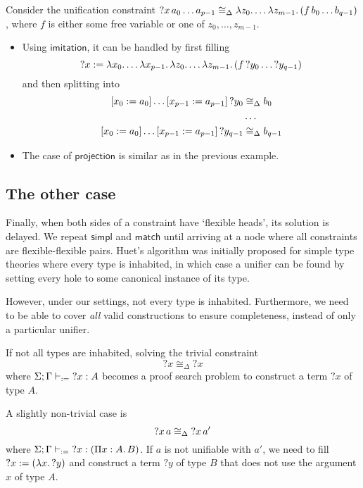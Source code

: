 \documentclass[twoside]{report}
\begin{document}
\begin{example}
Consider the unification constraint ${{{?x}\,{a_0}}\,{\ldots}}\,{a_{p-1}} \cong_\Delta \lambda{z_0}.\,{\ldots \lambda{z_{m-1}}.\,{({{{f}\,{b_0}}\,{\ldots}}\,{b_{q-1}})}}$, where $f$ is either some free variable or one of $z_0, \ldots, z_{m-1}$.

\begin{itemize}
    \item Using $\mathsf{imitation}$, it can be handled by first filling
    $$
    {?x} :=
        \lambda{x_0}.\,{\ldots \lambda{x_{p-1}}.\,{\lambda{z_0}.\,{\ldots \lambda{z_{m-1}}.\,{
            ({{f}\,{?y_0}}\,{\ldots {?y_{q-1}}})
        }}}}
    $$
    and then splitting into
    $$
    \begin{aligned}
    \llet {x_0} {a_0} {\ldots \llet {x_{p-1}} {a_{p-1}} {?y_0}} &\cong_\Delta b_0 \\
      & \ldots \\
    \llet {x_0} {a_0} {\ldots \llet {x_{p-1}} {a_{p-1}} {?y_{q-1}}} &\cong_\Delta b_{q-1} \\
    \end{aligned}
    $$

    \item The case of $\mathsf{projection}$ is similar as in the previous example.
\end{itemize}
\end{example}

\subsection*{The other case}

Finally, when both sides of a constraint have `flexible heads', its solution is delayed. We repeat $\mathsf{simpl}$ and $\mathsf{match}$ until arriving at a node where all constraints are flexible-flexible pairs. Huet's algorithm was initially proposed for simple type theories where every type is inhabited, in which case a unifier can be found by setting every hole to some canonical instance of its type.

However, under our settings, not every type is inhabited. Furthermore, we need to be able to cover \emph{all} valid constructions to ensure completeness, instead of only a particular unifier.

\begin{example}
If not all types are inhabited, solving the trivial constraint
$${?x} \cong_\Delta {?x}$$
where $\Sigma; \Gamma \vdash_{:=} {?x} : A$ becomes a proof search problem to construct a term ${?x}$ of type $A$.

A slightly non-trivial case is
$${?x}\,{a} \cong_\Delta {?x}\,{a}'$$
where $\Sigma; \Gamma \vdash_{:=} {?x} : (\Pi{x} : {A}.\,{B})$. If $a$ is not unifiable with $a'$, we need to fill ${?x} := (\lambda{x}.\,{?y})$ and construct a term ${?y}$ of type $B$ that does not use the argument $x$ of type $A$.
\end{example}
\end{document}
